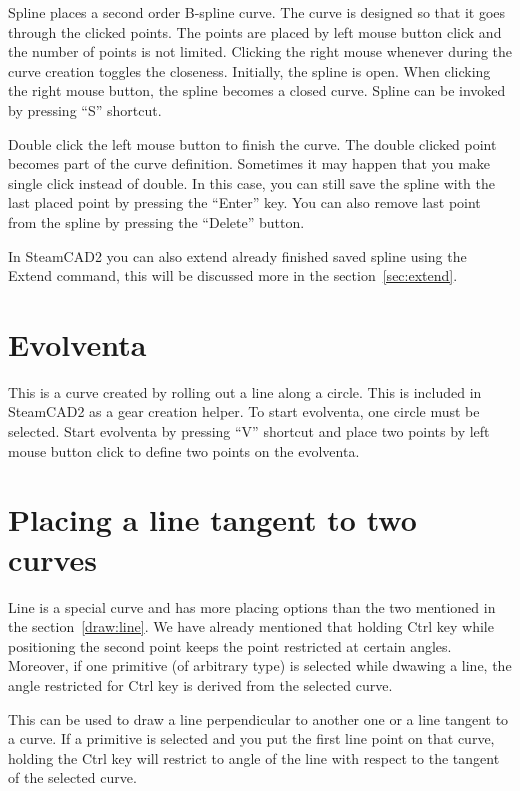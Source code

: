 Spline places a second order B-spline curve. The curve is designed so that it goes through
the clicked points. The points are placed by left mouse button click and the number of
points is not limited. Clicking the right mouse whenever during the curve creation toggles
the closeness. Initially, the spline is open. When clicking the right mouse button, the spline
becomes a closed curve. Spline can be invoked by pressing ``S'' shortcut.

Double click the left mouse button to finish the curve. The double clicked point becomes
part of the curve definition. Sometimes it may happen that you make single click instead
of double. In this case, you can still save the spline with the last placed point by
pressing the ``Enter'' key. You can also remove last point from the spline by pressing
the ``Delete'' button.

In SteamCAD2 you can also extend already finished saved spline using the Extend command,
this will be discussed more in the section~\ref{sec:extend}.

\section{Evolventa}

This is a curve created by rolling out a line along a circle. This is included in SteamCAD2
as a gear creation helper. To start evolventa, one circle must be selected. Start evolventa
by pressing ``V'' shortcut and place two points by left mouse button click to define two
points on the evolventa.

\section{Placing a line tangent to two curves}

Line is a special curve and has more placing options than the two mentioned in the
section~\ref{draw:line}. We have already mentioned that holding Ctrl key while positioning
the second point keeps the point restricted at certain angles. Moreover, if one primitive
(of arbitrary type) is selected while dwawing a line, the angle restricted for Ctrl key
is derived from the selected curve.

This can be used to draw a line perpendicular to another one or a line tangent to a curve.
If a primitive is selected and you put the first line point on that curve, holding the Ctrl
key will restrict to angle of the line with respect to the tangent of the selected curve.

